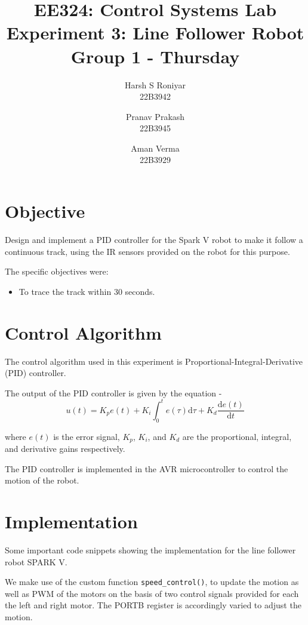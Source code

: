 \documentclass{article}
\title{EE324: Control Systems Lab \\ Experiment 3: Line Follower Robot\\ \textbf{Group 1 - Thursday}}
\author{\large Harsh S Roniyar\\ \large 22B3942 \and \large Pranav Prakash\\ \large 22B3945 \and \large Aman Verma\\ \large 22B3929}
\begin{document}
\maketitle

\section{Objective}

Design and implement a PID controller for the Spark V robot to make it follow a continuous track, using the IR sensors provided on the robot for this purpose.
\vspace{5pt}

The specific objectives were:
\begin{itemize}[noitemsep]
  \item To trace the track within 30 seconds.
\end{itemize}

\section{Control Algorithm}

The control algorithm used in this experiment is Proportional-Integral-Derivative (PID) controller. 

The output of the PID controller is given by the equation -
\begin{equation}
  u(t) = K_p e(t) + K_i \int_{0}^{t} e(\tau) \text{d}\tau + K_d \frac{\text{d}e(t)}{\text{d}t}
\end{equation}

where $e(t)$ is the error signal, $K_p$, $K_i$, and $K_d$ are the proportional, integral, and derivative gains respectively. 

The PID controller is implemented in the AVR microcontroller to control the motion of the robot. 

\section{Implementation}
Some important code snippets showing the implementation for the line follower robot SPARK V.

We make use of the custom function \texttt{speed\_control()}, to update the motion as well as PWM of the motors on the basis of two control signals provided for each the left and right motor. The PORTB register is accordingly varied to adjust the motion.

\end{document}
